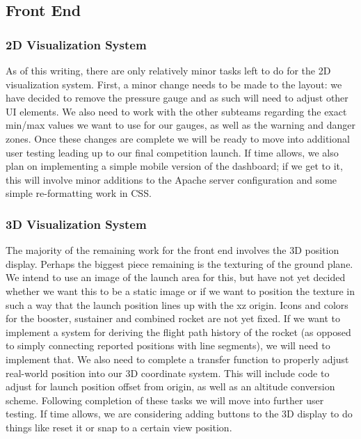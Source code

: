 \documentclass[journal,10pt,onecolumn,compsoc]{IEEEtran}
\begin{document}
	\subsection{Front End}
	
		\subsubsection{2D Visualization System}
			As of this writing, there are only relatively minor tasks left to do for the 2D visualization system. 
			First, a minor change needs to be made to the layout: we have decided to remove the pressure gauge and as such will need to adjust other UI elements.
			We also need to work with the other subteams regarding the exact min/max values we want to use for our gauges, as well as the warning and danger zones.
			Once these changes are complete we will be ready to move into additional user testing leading up to our final competition launch.
			If time allows, we also plan on implementing a simple mobile version of the dashboard; if we get to it, this will involve minor additions to the Apache server configuration and some simple re-formatting work in CSS.
		\subsubsection{3D Visualization System}
			The majority of the remaining work for the front end involves the 3D position display.
			Perhaps the biggest piece remaining is the texturing of the ground plane.
			We intend to use an image of the launch area for this, but have not yet decided whether we want this to be a static image or if we want to position the texture in such a way that the launch position lines up with the xz origin.
			Icons and colors for the booster, sustainer and combined rocket are not yet fixed.
			If we want to implement a system for deriving the flight path history of the rocket (as opposed to simply connecting reported positions with line segments), we will need to implement that.
			We also need to complete a transfer function to properly adjust real-world position into our 3D coordinate system.
			This will include code to adjust for launch position offset from origin, as well as an altitude conversion scheme.
			Following completion of these tasks we will move into further user testing.
			If time allows, we are considering adding buttons to the 3D display to do things like reset it or snap to a certain view position.
\newpage

\end{document}
